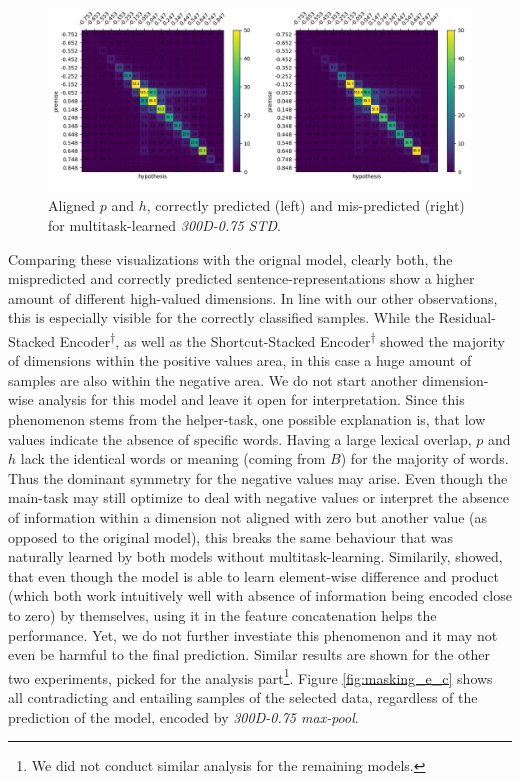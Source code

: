 \begin{figure}[tph!]
\centering
	\includegraphics[totalheight=7cm]{fig/300d75_correct_incorrect_c.png}
	\caption{Aligned $p$ and $h$, correctly predicted (left) and mis-predicted (right) for multitask-learned \textit{300D-0.75 STD}.}
	\label{fig:300d75_correct_incorrect_c}
\end{figure}
Comparing these visualizations with the orignal model, clearly both, the mispredicted and correctly predicted sentence-representations show a higher amount of different high-valued dimensions. In line with our other observations, this is especially visible for the correctly classified samples. While the Residual-Stacked Encoder\textsuperscript{$\dagger$}, as well as the Shortcut-Stacked Encoder\textsuperscript{$\dagger$} showed the majority of dimensions within the positive values area, in this case a huge amount of samples are also within the negative area. We do not start another dimension-wise analysis for this model and leave it open for interpretation. Since this phenomenon stems from the helper-task, one possible explanation is, that low values indicate the absence of specific words. Having a large lexical overlap, $p$ and $h$ lack the identical words or meaning (coming from $B$) for the majority of words. Thus the dominant symmetry for the negative values may arise. Even though the main-task may still optimize to deal with negative values or interpret the absence of information within a dimension not aligned with zero but another value (as opposed to the original model), this breaks the same behaviour that was naturally learned by both models without multitask-learning. Similarily, \cite{mou2015natural} showed, that even though the model is able to learn element-wise difference and product (which both work intuitively well with absence of information being encoded close to zero) by themselves, using it in the feature concatenation helps the performance. Yet, we do not further investiate this phenomenon and it may not even be harmful to the final prediction. Similar results are shown for the other two experiments, picked for the analysis part\footnote{We did not conduct similar analysis for the remaining models.}. Figure \ref{fig:masking_e_c} shows all contradicting and entailing samples of the selected data, regardless of the prediction of the model, encoded by \textit{300D-0.75 max-pool}.
